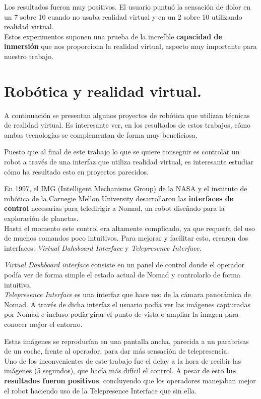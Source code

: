 \documentclass[twoside, 11pt]{epstfg}
\begin{document}
Los resultados fueron muy positivos. El usuario puntuó la sensación de dolor en un 7 sobre 10 cuando no usaba realidad virtual y en un 2 sobre 10 utilizando realidad virtual.\cite{JCLP:JCLP10244}\\
Estos experimentos suponen una prueba de la increíble \textbf{capacidad de inmersión} que nos proporciona la realidad virtual, aspecto muy importante para nuestro trabajo.



\section{Robótica y realidad virtual.} 
\label{sec:robotica y VR}

A continuación se presentan algunos proyectos de robótica que utilizan técnicas de realidad virtual. Es interesante ver, en los resultados de estos trabajos, cómo ambas tecnologías se complementan de forma muy beneficiosa. \cite{patton2006robotics}

Puesto que al final de este trabajo lo que se quiere conseguir es controlar un robot a través de una interfaz que utiliza realidad virtual, es interesante estudiar cómo ha resultado esto en proyectos parecidos.

En 1997, el IMG (Intelligent Mechanisms Group) de la NASA y el instituto de robótica de la Carnegie Mellon University desarrollaron las \textbf{interfaces de control} necesarias para teledirigir a Nomad, un robot diseñado para la exploración de planetas. \cite{Nguyen2001}\\
Hasta el momento este control era altamente complicado, ya que requería del uso de muchos comandos poco intuitivos. Para mejorar y facilitar esto, crearon dos interfaces:\textit{ Virtual Dahsboard Interface} y \textit{Telepresence Interface}.

\textit{Virtual Dashboard interface} consiste en un panel de control donde el operador podía ver de forma simple el estado actual de Nomad y controlarlo de forma intuitiva.\\
\textit{Telepresence Interface} es una interfaz que hace uso de la cámara panorámica de Nomad. A través de dicha interfaz el usuario podía ver las imágenes capturadas por Nomad e incluso podía girar el punto de vista o ampliar la imagen para conocer mejor el entorno.

Estas imágenes se reproducían en una pantalla ancha, parecida a un parabrisas de un coche, frente al operador, para dar más sensación de telepresencia.\\
Uno de los inconvenientes de este trabajo fue el delay a la hora de recibir las imágenes (5 segundos), que hacía más difícil el control.
A pesar de esto \textbf{los resultados fueron positivos}, concluyendo que los operadores manejaban mejor el robot haciendo uso de la Telepresence Interface que sin ella.
\end{document}
